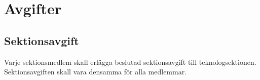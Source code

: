 \section{Avgifter}

\subsection{Sektionsavgift}
Varje sektionsmedlem skall erlägga beslutad sektionsavgift till teknologsektionen. Sektionsavgiften skall vara densamma för alla medlemmar.